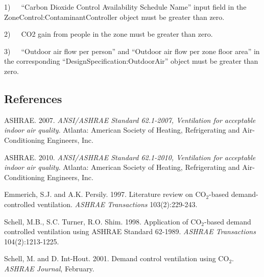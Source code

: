 1)~~~``Carbon Dioxide Control Availability Schedule Name'' input field in the ZoneControl:ContaminantController object must be greater than zero.

2)~~~CO2 gain from people in the zone must be greater than zero.

3)~~~``Outdoor air flow per person'' and ``Outdoor air flow per zone floor area'' in the corresponding ``DesignSpecification:OutdoorAir'' object must be greater than zero.

\subsection{References}\label{references-018}

ASHRAE. 2007. \emph{ANSI/ASHRAE Standard 62.1-2007, Ventilation for acceptable indoor air quality}. Atlanta: American Society of Heating, Refrigerating and Air-Conditioning Engineers, Inc.

ASHRAE. 2010. \emph{ANSI/ASHRAE Standard 62.1-2010, Ventilation for acceptable indoor air quality}. Atlanta: American Society of Heating, Refrigerating and Air-Conditioning Engineers, Inc.

Emmerich, S.J. and A.K. Persily. 1997. Literature review on CO\(_{2}\)-based demand-controlled ventilation. \emph{ASHRAE Transactions} 103(2):229-243.

Schell, M.B., S.C. Turner, R.O. Shim. 1998. Application of CO\(_{2}\)-based demand controlled ventilation using ASHRAE Standard 62-1989. \emph{ASHRAE Transactions} 104(2):1213-1225.

Schell, M. and D. Int-Hout. 2001. Demand control ventilation using CO\(_{2}\). \emph{ASHRAE Journal}, February.
